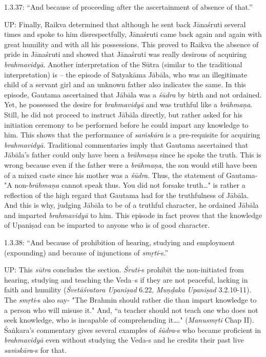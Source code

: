 1.3.37: “And because of proceeding after the ascertainment of absence of that.”

\newpage

UP: Finally, Raikva determined that although he sent back Jānaśruti several times and spoke to him disrespectfully, Jānaśruti came back again and again with great humility and with all his possessions. This proved to Raikva the absence of pride in Jānaśruti and showed that Jānaśruti was really desirous of acquiring \textit{brahmavidyā}. Another interpretation of the Sūtra (similar to the traditional interpretation) is – the episode of Satyakāma Jābāla, who was an illegitimate child of a servant girl and an unknown father also indicates the same. In this episode, Gautama ascertained that Jābāla was a \textit{śūdra} by birth and not ordained. Yet, he possessed the desire for \textit{brahmavidyā} and was truthful like a \textit{brāhmaṇa}. Still, he did not proceed to instruct Jābāla directly, but rather asked for his initiation ceremony to be performed before he could impart any knowledge to him. This shows that the performance of \textit{saṁskāra} is a pre-requisite for acquiring \textit{brahmavidyā}. Traditional commentaries imply that Gautama ascertained that Jābāla's father could only have been a \textit{brāhmaṇa} since he spoke the truth. This is wrong because even if the father were a \textit{brāhmaṇa}, the son would still have been of a mixed caste since his mother was a \textit{śūdra}. Thus, the statement of Gautama- "A non-\textit{brāhmaṇa} cannot speak thus. You did not forsake truth…" is rather a reflection of the high regard that Gautama had for the truthfulness of Jābāla. And this is why, judging Jābāla to be of a truthful character, he ordained Jābāla and imparted \textit{brahmavidyā} to him. This episode in fact proves that the knowledge of Upaniṣad can be imparted to anyone who is of good character.

1.3.38: “And because of prohibition of hearing, studying and employment (expounding) and because of injunctions of \textit{smṛti}-s.”

UP: This \textit{sūtra} concludes the section. \textit{Śruti}-s prohibit the non-initiated from hearing, studying and teaching the Veda--s if they are not peaceful, lacking in faith and humility (\textit{Śvetāśvatara Upaniṣad } 6.22, \textit{Muṇḍaka Upaniṣad }3.2.10-11). The \textit{smṛti}-s also say- "The Brahmin should rather die than impart knowledge to a person who will misuse it." And, “a teacher should not teach one who does not seek knowledge, who is incapable of comprehending it…." (\textit{Manusmṛti} Chap II). Śaṅkara’s commentary gives several examples of \textit{śūdra}-s who became proficient in \textit{brahmavidyā} even without studying the Veda-s and he credits their past live \textit{saṁskāra}-s for that.


